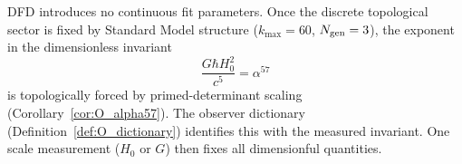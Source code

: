 \begin{tcolorbox}[colback=blue!5!white, colframe=blue!60!black, title=Zero Continuous Parameters --- Dictionary-Closed (Appendix~\ref{app:O_alpha57_clean})]
DFD introduces no continuous fit parameters. Once the discrete topological sector is fixed by Standard Model structure ($k_{\max} = 60$, $N_{\rm gen} = 3$), the exponent in the dimensionless invariant
\begin{equation}
\frac{G\hbar H_0^2}{c^5} = \alpha^{57}
\end{equation}
is topologically forced by primed-determinant scaling (Corollary~\ref{cor:O_alpha57}). The observer dictionary (Definition~\ref{def:O_dictionary}) identifies this with the measured invariant. One scale measurement ($H_0$ or $G$) then fixes all dimensionful quantities.
\end{tcolorbox}

